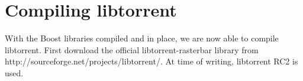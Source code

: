 \section{Compiling libtorrent}
	With the Boost libraries compiled and in place, we are now able to compile libtorrent. First download the official libtorrent-rasterbar library from http://sourceforge.net/projects/libtorrent/. At time of writing, libtorrent RC2 is used.